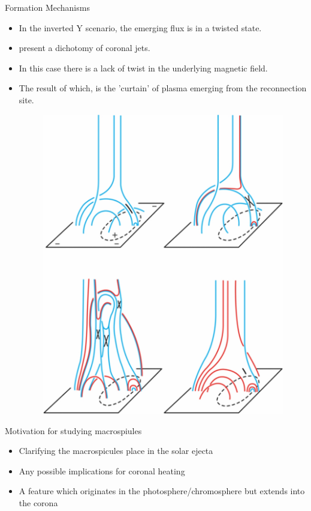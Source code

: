 \documentclass{beamer}
\begin{document}
	\begin{frame}{Formation Mechanisms}
		\begin{itemize}
			\item{In the inverted Y scenario, the emerging flux is in a twisted state.}
			\item{\cite{Moore2010} present a dichotomy of coronal jets.}
			\item{In this case there is a lack of twist in the underlying magnetic field.}
			\item{The result of which, is the 'curtain' of plasma emerging from the reconnection site.}
			\begin{figure}
				\includegraphics[scale=0.2]{"Figs/blowout_jet.jpg"}
				\caption{\cite{Moore2010}}
			\end{figure}
		\end{itemize}
	\end{frame}
	
	
	\begin{frame}{Motivation for studying macrospiules}
		\begin{itemize}
			\item{Clarifying the macrospicules place in the solar ejecta}
			\item{Any possible implications for coronal heating}
			\item{A feature which originates in the photosphere/chromosphere but extends into the corona}
		\end{itemize}
	\end{frame}		
\end{document}
